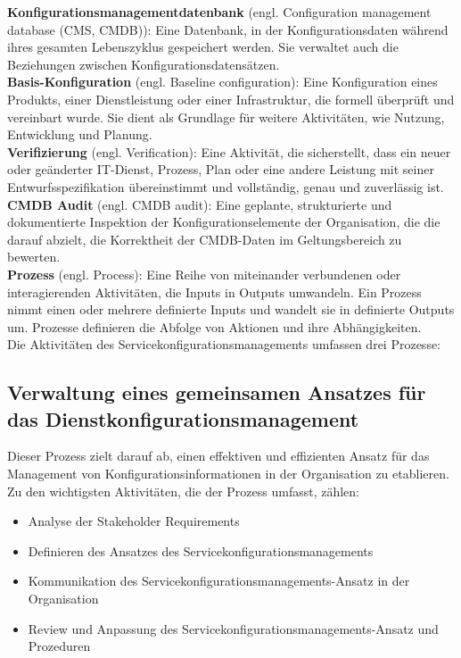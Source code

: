 \noindent
\textbf{Konfigurationsmanagementdatenbank} (engl. Configuration management database
(CMS, CMDB)):
Eine Datenbank, in der Konfigurationsdaten während ihres gesamten Lebenszyklus gespeichert werden. Sie verwaltet auch die
Beziehungen zwischen Konfigurationsdatensätzen. \\

\noindent
\textbf{Basis-Konfiguration} 
(engl. Baseline configuration):
Eine Konfiguration eines Produkts, einer Dienstleistung oder einer Infrastruktur, die formell überprüft und
vereinbart wurde. Sie dient als Grundlage für weitere Aktivitäten, wie Nutzung, Entwicklung und Planung. \\

\noindent
\textbf{Verifizierung} 
(engl. Verification):
Eine Aktivität, die sicherstellt, dass ein neuer oder geänderter IT-Dienst, Prozess, Plan oder eine andere Leistung
mit seiner Entwurfsspezifikation übereinstimmt und vollständig, genau und zuverlässig ist. \\

\noindent
\textbf{CMDB Audit} 
(engl. CMDB audit):
Eine geplante, strukturierte und dokumentierte Inspektion der Konfigurationselemente der Organisation, die
die darauf abzielt, die Korrektheit der CMDB-Daten im Geltungsbereich zu bewerten. \\

\noindent
\textbf{Prozess} 
(engl. Process):
Eine Reihe von miteinander verbundenen oder interagierenden Aktivitäten, die Inputs in Outputs umwandeln. Ein Prozess nimmt
einen oder mehrere definierte Inputs und wandelt sie in definierte Outputs um. Prozesse definieren die Abfolge von
Aktionen und ihre Abhängigkeiten. \\

\noindent
Die Aktivitäten des Servicekonfigurationsmanagements umfassen drei Prozesse:

\subsection*{Verwaltung eines gemeinsamen Ansatzes für das Dienstkonfigurationsmanagement}

Dieser Prozess zielt darauf ab, einen effektiven und effizienten Ansatz für das Management von
Konfigurationsinformationen in der Organisation zu etablieren. 
Zu den wichtigsten Aktivitäten, die der Prozess umfasst, zählen:

\begin{itemize}
	\item Analyse der Stakeholder Requirements
	\item Definieren des Ansatzes des Servicekonfigurationsmanagements
	\item Kommunikation des Servicekonfigurationsmanagements-Ansatz in der Organisation
	\item Review und Anpassung des Servicekonfigurationsmanagements-Ansatz und Prozeduren
\end{itemize}

